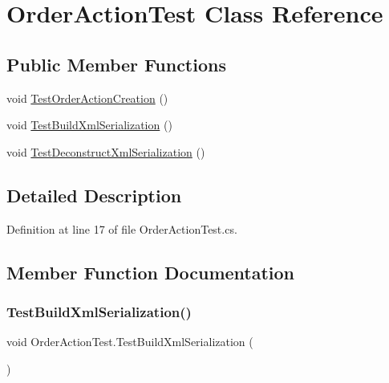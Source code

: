 \hypertarget{class_order_action_test}{}\section{Order\+Action\+Test Class Reference}
\label{class_order_action_test}
\subsection*{Public Member Functions}
\begin{DoxyCompactItemize}
\item 
void \hyperlink{class_order_action_test_a138f880c2c0966a9c1b975986bc059d1}{Test\+Order\+Action\+Creation} ()
\item 
void \hyperlink{class_order_action_test_aeeddaa259572c69b7970d335e88efc44}{Test\+Build\+Xml\+Serialization} ()
\item 
void \hyperlink{class_order_action_test_ad9a158cdf42e0a3c2c0371fa822a62be}{Test\+Deconstruct\+Xml\+Serialization} ()
\end{DoxyCompactItemize}


\subsection{Detailed Description}


Definition at line 17 of file Order\+Action\+Test.\+cs.



\subsection{Member Function Documentation}
\mbox{\label{class_order_action_test_aeeddaa259572c69b7970d335e88efc44}} 
\subsubsection{\texorpdfstring{Test\+Build\+Xml\+Serialization()}{TestBuildXmlSerialization()}}
{\footnotesize\ttfamily void Order\+Action\+Test.\+Test\+Build\+Xml\+Serialization (\begin{DoxyParamCaption}{ }\end{DoxyParamCaption})}



